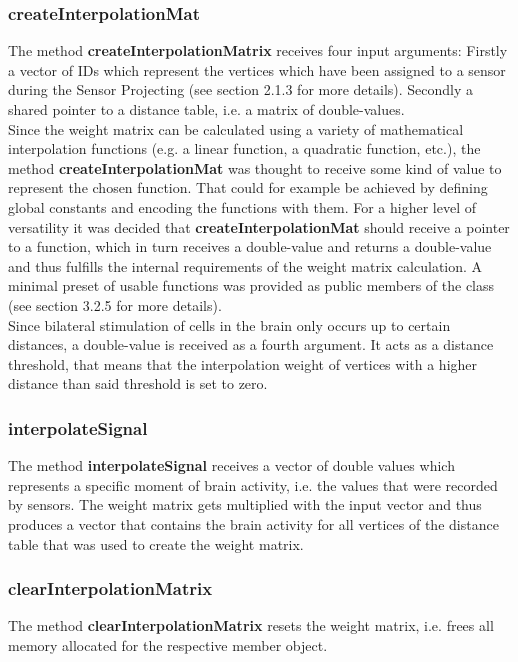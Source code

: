 \subsubsection{createInterpolationMat}
The method \textbf{createInterpolationMatrix} receives four input arguments: Firstly a vector of IDs which represent the vertices which have been assigned to a sensor during the Sensor Projecting (see section 2.1.3 for more details). Secondly a shared pointer to a distance table, i.e. a matrix of double-values.\\
Since the weight matrix can be calculated using a variety of mathematical interpolation functions (e.g. a linear function, a quadratic function, etc.), the method \textbf{createInterpolationMat} was thought to receive some kind of value to represent the chosen function. That could for example be achieved by defining global constants and encoding the functions with them. For a higher level of versatility it was decided that \textbf{createInterpolationMat} should receive a pointer to a function, which in turn receives a double-value and returns a double-value and thus fulfills the internal requirements of the weight matrix calculation. A minimal preset of usable functions was provided as public members of the class (see section 3.2.5 for more details).\\
Since bilateral stimulation of cells in the brain only occurs up to certain distances, a double-value is received as a fourth argument. It acts as a distance threshold, that means that the interpolation weight of vertices with a higher distance than said threshold is set to zero. 

\subsubsection{interpolateSignal}
The method \textbf{interpolateSignal} receives a vector of double values which represents a specific moment of brain activity, i.e. the values that were recorded by sensors. The weight matrix gets multiplied with the input vector and thus produces a vector that contains the brain activity for all vertices of the distance table that was used to create the weight matrix.

\subsubsection{clearInterpolationMatrix}
The method \textbf{clearInterpolationMatrix} resets the weight matrix, i.e. frees all memory allocated for the respective member object.
\\\\

